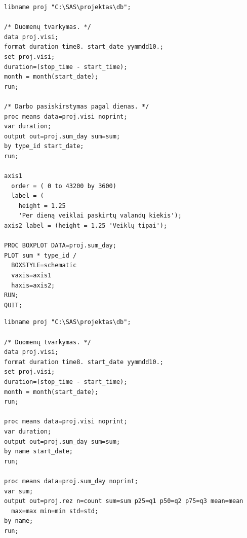 \begin{listing}[H]
  \begin{verbatim}
libname proj "C:\SAS\projektas\db";

/* Duomenų tvarkymas. */
data proj.visi;
format duration time8. start_date yymmdd10.;
set proj.visi;
duration=(stop_time - start_time);
month = month(start_date);
run;

/* Darbo pasiskirstymas pagal dienas. */
proc means data=proj.visi noprint;
var duration;
output out=proj.sum_day sum=sum;
by type_id start_date;
run;

axis1 
  order = ( 0 to 43200 by 3600)
  label = (
    height = 1.25
    'Per dieną veiklai paskirtų valandų kiekis');
axis2 label = (height = 1.25 'Veiklų tipai');

PROC BOXPLOT DATA=proj.sum_day;
PLOT sum * type_id /
  BOXSTYLE=schematic
  vaxis=axis1
  haxis=axis2;
RUN;
QUIT;
  \end{verbatim}
  \caption{SAS programa naudota per dieną dalykui paskirtų valandų
  diagramos braižymui.}
  \label{lst:day_duration_box}
\end{listing}

\begin{listing}[H]
  \begin{verbatim}
libname proj "C:\SAS\projektas\db";

/* Duomenų tvarkymas. */
data proj.visi;
format duration time8. start_date yymmdd10.;
set proj.visi;
duration=(stop_time - start_time);
month = month(start_date);
run;

proc means data=proj.visi noprint;
var duration;
output out=proj.sum_day sum=sum;
by name start_date;
run;

proc means data=proj.sum_day noprint;
var sum;
output out=proj.rez n=count sum=sum p25=q1 p50=q2 p75=q3 mean=mean
  max=max min=min std=std;
by name;
run;
  \end{verbatim}
  \caption{SAS programa naudota per dieną dalykui paskirtų valandų kiekio
  analizei.}
  \label{lst:day_duration_table}
\end{listing}
